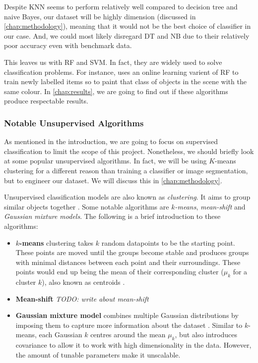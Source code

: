Despite KNN seems to perform relatively well compared to decision tree and naive Bayes, our dataset will be highly dimension (discussed in \autoref{chap:methodology}), meaning that it would not be the best choice of classifier in our case. And, we could most likely disregard DT and NB due to their relatively poor accuracy even with benchmark data.

This leaves us with RF and SVM. In fact, they are widely used to solve classification problems. For instance, \cite{semantic-paint} uses an online learning varient of RF to train newly labelled items so to paint that class of objects in the scene with the same colour. In \autoref{chap:results}, we are going to find out if these algorithms produce respectable results.

\subsubsection{Notable Unsupervised Algorithms}
As mentioned in the introduction, we are going to focus on supervised classification to limit the scope of this project. Nonetheless, we should briefly look at some popular unsupervised algorithms. In fact, we will be using $K$-means clustering for a different reason than training a classifier or image segmentation, but to engineer our dataset. We will discuss this in \autoref{chap:methodology}.

Unsupervised classification models are also known as \textit{clustering}. It aims to group similar objects together \cite{mur-book}. Some notable algorithms are \textit{$k$-means}, \textit{mean-shift} and \textit{Gaussian mixture models}. The following is a brief introduction to these algorithms:

\begin{itemize}
  \item \textbf{$k$-means} clustering takes $k$ random datapoints to be the starting point. These points are moved until the groups become stable and produces groups with minimal distances between each point and their surroundings. These points would end up being the mean of their corresponding cluster ($\mu_k$ for a cluster $k$), also known as centroids \cite{bishop-book}.

  \item \textbf{Mean-shift} \textit{TODO: write about mean-shift} 

  \item \textbf{Gaussian mixture model} combines multiple Gaussian distributions by imposing them to capture more information about the dataset \cite{bishop}. Similar to $k$-means, each Gaussian $k$ centres around the mean $\mu_k$, but also introduces covariance to allow it to work with high dimensionality in the data. However, the amount of tunable parameters make it unscalable.
\end{itemize}


